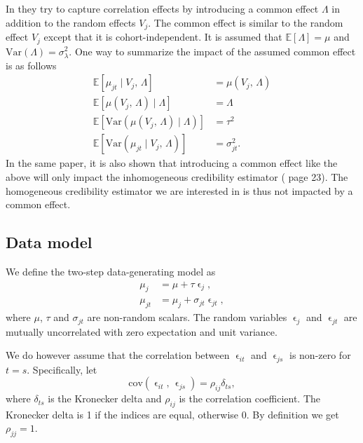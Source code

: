 \documentclass[11pt]{article}
\theoremstyle{definition}
\begin{document}
In \cite{wen2} they try to capture correlation effects by introducing a common effect $\Lambda$ in addition to the random effects $V_j$. The common effect is similar to the random effect $V_j$ except that it is cohort-independent. It is assumed that $\mathds{E}[\Lambda]=\mu$ and $\text{Var}(\Lambda)=\sigma_\lambda^2$. One way to summarize the impact of the assumed common effect is as follows
\begin{equation*}
    \begin{aligned}
        \mathds{E}[\mu_{jt}\mid V_j,\,\Lambda] &= \mu(V_j,\, \Lambda) \\
        \mathds{E}[\mu(V_j,\, \Lambda) \mid \Lambda] &= \Lambda \\
        \mathds{E}[\text{Var}(\mu(V_j,\, \Lambda)\mid \Lambda)] &= \tau^2  \\
        \mathds{E}[\text{Var}(\mu_{jt}\mid V_j,\,\Lambda)] &= \sigma_{jt}^2.
    \end{aligned}
\end{equation*}
In the same paper, it is also shown that introducing a common effect like the above will only impact the inhomogeneous credibility estimator (\cite{wen2} page 23). The homogeneous credibility estimator we are interested in is thus not impacted by a common effect.

\subsection{Data model}
We define the two-step data-generating model as
\begin{equation}\label{eq:data_model}
    \begin{aligned}
    \mu_j &= \mu + \tau\upvarepsilon_j,\\
    \mu_{jt} &= \mu_j + \sigma_{jt}\upvarepsilon_{jt},
    \end{aligned}
\end{equation}
where $\mu$, $\tau$ and $\sigma_{jt}$ are non-random scalars. The random variables $\upvarepsilon_j$ and $\upvarepsilon_{jt}$ are mutually uncorrelated with zero expectation and unit variance.

We do however assume that the correlation between $\upvarepsilon_{it}$ and $\upvarepsilon_{js}$ is non-zero for $t=s$. Specifically, let 
\begin{equation*}
    \text{cov}(\upvarepsilon_{it},\, \upvarepsilon_{js}) = \rho_{ij}\delta_{ts},
\end{equation*}
where $\delta_{ts}$ is the Kronecker delta and $\rho_{ij}$ is the correlation coefficient. The Kronecker delta is 1 if the indices are equal, otherwise 0. By definition we get $\rho_{jj}=1$.
\end{document}
